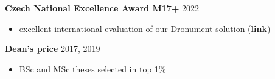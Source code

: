 \documentclass[12pt,a4paper]{article}
\newcommand\Colorhref[3][ref]{\href{#2}{\color{#1}#3}}
\begin{document}
\begin{paracol}{2}
\vspace{0.2cm}
\noindent
\textbf{Czech National Excellence Award M17+} \hfill 2022
\begin{itemize}
  \item excellent international evaluation of our Dronument solution (\Colorhref{https://mrs.fel.cvut.cz/dg18p02ovv069-fvz}{\textbf{link}})
\end{itemize}

\vspace{0.2cm}
\noindent
\textbf{Dean's price} \hfill 2017, 2019
\begin{itemize}
  \item BSc and MSc theses selected in top 1\%
\end{itemize}

\end{paracol}
\end{document}
